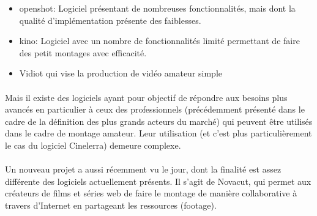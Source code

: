 \begin {itemize}

  \item {openshot: Logiciel présentant  de nombreuses fonctionnalités,
  mais dont la
    qualité d'implémentation présente des faiblesses.}

  \item {kino: Logiciel avec un nombre de fonctionnalités limité
  permettant de faire des petit montages avec efficacité.}

  \item {Vidiot qui vise la production de vidéo amateur simple}

\end {itemize}

\paragraph {}

Mais il existe des logiciels ayant pour objectif de répondre aux besoins
plus avancés en particulier à ceux des professionnels (précédemment
présenté dans le cadre de la définition des plus grands acteurs du
marché) qui peuvent être utilisés dans le cadre de montage amateur.
Leur utilisation (et c'est plus particulièrement le cas du logiciel
Cinelerra) demeure complexe.

\paragraph{}

Un nouveau projet a aussi récemment vu le jour, dont la finalité est
assez différente des logiciels actuellement présents. Il s'agit de
Novacut, qui permet aux créateurs de films et séries web de faire le
montage de manière collaborative à travers d'Internet en partageant
les ressources (footage).

\paragraph{}






